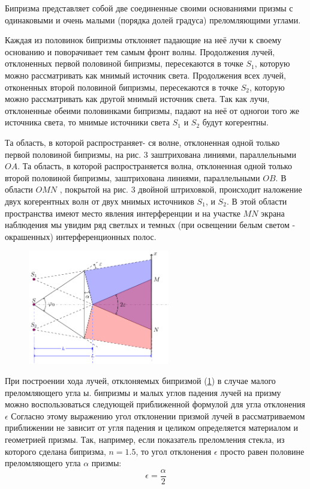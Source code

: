 Бипризма представляет собой две соединенные своими основаниями призмы с одинаковыми и очень малыми (порядка долей градуса) преломляющими углами. 

Каждая из половинок бипризмы отклоняет падающие на неё лучи к своему основанию и поворачивает тем самым фронт волны.  Продолжения лучей, отклоненных первой половиной бипризмы, пересекаются в точке $S_1$, которую можно рассматривать как мнимый источник света. Продолжения всех лучей, отконенных второй половиной бипризмы, пересекаются в точке $S_2$, которую можно рассматривать как другой мнимый источник света. Так как лучи, отклоненные обеими половинками бипризмы, падают на неё от одногои того же источника света, то мнимые источники света $S_1$ и $S_2$ будут когерентны. 

Та область, в которой распространяет- ся волне, отклоненная одной только первой половиной бипризмы, на рис. 3 заштрихована линиями, параллельными $OA$. Та область, в которой распространяется волна, отклоненная одной только второй половиной бипризмы, заштрихована линиями, параллельными $OB$. В области $OMN$ , покрытой на рис. 3 двойной
штриховкой, происходит наложение двух когерентных волн от двух мнимых источников $S_1$, и $S_2$. В этой области пространства имеют место явления интерференции и на участке $MN$ экрана
наблюдения мы увидим ряд светлых и темных (при освещении белым светом - окрашенных) интерференционных полос.

\begin{figure}[H]
	\centering
	\includegraphics[width=0.55\textwidth]{ris/ris3}
	\caption{ }
	\label{fig:ris3}
\end{figure}

При построении хода лучей, отклоняемых бипризмой (\ref{fig:ris3}) в случае малого преломляющего угла ы. бипризмы и малых углов падения лучей на призму можно воспользоваться следующей приближенной формулой для угла отклонения $\epsilon$
Согласно этому выражению угол отклонении призмой лучей в рассматриваемом приближении не зависит от угля падения и целиком определяется материалом и геометрией призмы. Так, например, если показатель преломления стекла, из которого сделана бипризма, $n=1.5$, то угол отклонения $\epsilon$ просто равен половине преломляющего угла $\alpha$ призмы:
\begin{equation}
 	\epsilon=\frac{\alpha}{2}
 \end{equation} 

